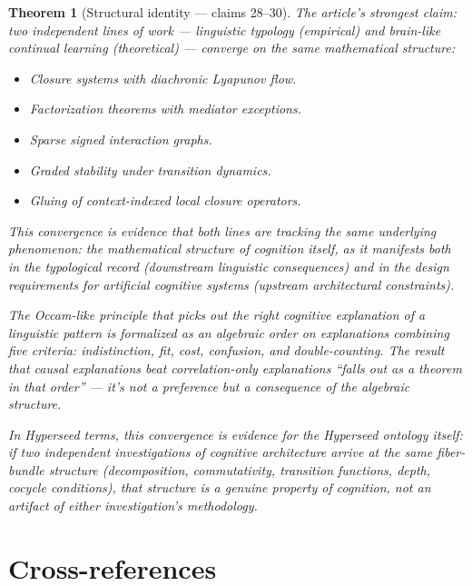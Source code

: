 \documentclass[11pt,a4paper]{article}
\newtheorem{theorem}[definition]{Theorem}
\begin{document}
\begin{theorem}[Structural identity --- claims 28--30]
\label{thm:convergence}
The article's strongest claim: two independent lines of work ---
linguistic typology (empirical) and brain-like continual learning
(theoretical) --- converge on the same mathematical structure:

\begin{itemize}
\item Closure systems with diachronic Lyapunov flow.
\item Factorization theorems with mediator exceptions.
\item Sparse signed interaction graphs.
\item Graded stability under transition dynamics.
\item Gluing of context-indexed local closure operators.
\end{itemize}

This convergence is evidence that both lines are tracking the same
underlying phenomenon: the mathematical structure of cognition itself,
as it manifests both in the typological record (downstream linguistic
consequences) and in the design requirements for artificial cognitive
systems (upstream architectural constraints).

The Occam-like principle that picks out the right cognitive explanation
of a linguistic pattern is formalized as an algebraic order on
explanations combining five criteria: indistinction, fit, cost,
confusion, and double-counting. The result that causal explanations
beat correlation-only explanations ``falls out as a theorem in that
order'' --- it's not a preference but a consequence of the algebraic
structure.

In Hyperseed terms, this convergence is evidence for the Hyperseed
ontology itself: if two independent investigations of cognitive
architecture arrive at the same fiber-bundle structure (decomposition,
commutativity, transition functions, depth, cocycle conditions), that
structure is a genuine property of cognition, not an artifact of
either investigation's methodology.
\end{theorem}


\section{Cross-references}
\end{document}
